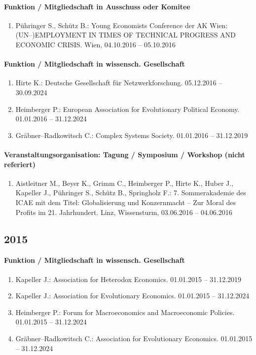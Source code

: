 \paragraph{Funktion / Mitgliedschaft in Ausschuss oder Komitee}
\begin{enumerate}[leftmargin=*, labelsep=0.5cm]
\item Pühringer S., Schütz B.: Young Economists Conference der AK Wien: (UN--)EMPLOYMENT IN TIMES OF TECHNICAL PROGRESS AND ECONOMIC CRISIS. Wien, 04.10.2016 -- 05.10.2016
\end{enumerate}
\paragraph{Funktion / Mitgliedschaft in wissensch. Gesellschaft}
\begin{enumerate}[leftmargin=*, labelsep=0.5cm]
\item Hirte K.: Deutsche Gesellschaft für Netzwerkforschung. 05.12.2016 -- 30.09.2024
\item Heimberger P.: European Association for Evolutionary Political Economy. 01.01.2016 -- 31.12.2024
\item Gräbner--Radkowitsch C.: Complex Systems Society. 01.01.2016 -- 31.12.2019
\end{enumerate}
\paragraph{Veranstaltungsorganisation: Tagung / Symposium / Workshop (nicht referiert)}
\begin{enumerate}[leftmargin=*, labelsep=0.5cm]
\item Aistleitner M., Beyer K., Grimm C., Heimberger P., Hirte K., Huber J., Kapeller J., Pühringer S., Schütz B., Springholz F.: 7. Sommerakademie des ICAE mit dem Titel: Globalisierung und Konzernmacht – Zur Moral des Profits im 21. Jahrhundert. Linz, Wissensturm, 03.06.2016 -- 04.06.2016
\end{enumerate}\subsection*{2015}\paragraph{Funktion / Mitgliedschaft in wissensch. Gesellschaft}
\begin{enumerate}[leftmargin=*, labelsep=0.5cm]
\item Kapeller J.: Association for Heterodox Economics. 01.01.2015 -- 31.12.2019
\item Kapeller J.: Association for Evolutionary Economics. 01.01.2015 -- 31.12.2024
\item Heimberger P.: Forum for Macroeconomics and Macroeconomic Policies. 01.01.2015 -- 31.12.2024
\item Gräbner--Radkowitsch C.: Association for Evolutionary Economics. 01.01.2015 -- 31.12.2024
\end{enumerate}
